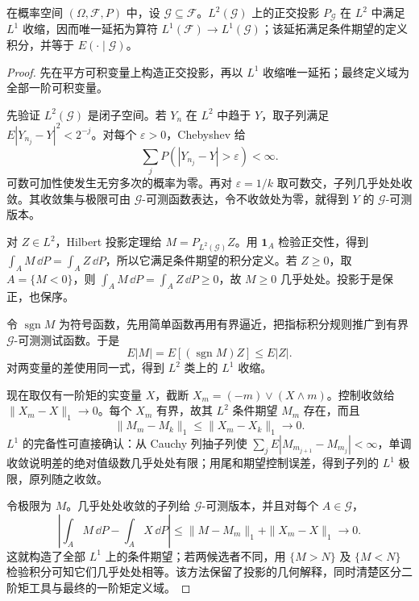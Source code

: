\begin{lemma}
在概率空间 $(\Omega,\mathcal F,P)$ 中，设 $\mathcal G\subseteq\mathcal F$。$L^2(\mathcal G)$ 上的正交投影 $P_{\mathcal G}$ 在 $L^2$ 中满足 $L^1$ 收缩，因而唯一延拓为算符 $L^1(\mathcal F)\to L^1(\mathcal G)$；该延拓满足条件期望的定义积分，并等于 $E(\cdot\mid\mathcal G)$。
\end{lemma}
\begin{proof}
先在平方可积变量上构造正交投影，再以 $L^1$ 收缩唯一延拓；最终定义域为全部一阶可积变量。

先验证 $L^2(\mathcal G)$ 是闭子空间。若 $Y_n$ 在 $L^2$ 中趋于 $Y$，取子列满足 $E|Y_{n_j}-Y|^2<2^{-j}$。对每个 $\varepsilon>0$，Chebyshev 给
\[
 \sum_jP(|Y_{n_j}-Y|>\varepsilon)<\infty.
\]
可数可加性使发生无穷多次的概率为零。再对 $\varepsilon=1/k$ 取可数交，子列几乎处处收敛。其收敛集与极限可由 $\mathcal G$-可测函数表达，令不收敛处为零，就得到 $Y$ 的 $\mathcal G$-可测版本。

对 $Z\in L^2$，Hilbert 投影定理给 $M=P_{L^2(\mathcal G)}Z$。用 $\mathbf1_A$ 检验正交性，得到 $\int_AM\,\dd P=\int_AZ\,\dd P$，所以它满足条件期望的积分定义。若 $Z\ge0$，取 $A=\{M<0\}$，则 $\int_AM\,\dd P=\int_AZ\,\dd P\ge0$，故 $M\ge0$ 几乎处处。投影于是保正，也保序。

令 $\operatorname{sgn}M$ 为符号函数，先用简单函数再用有界逼近，把指标积分规则推广到有界 $\mathcal G$-可测测试函数。于是
\[
 E|M|=E[(\operatorname{sgn}M)Z]\le E|Z|.
\]
对两变量的差使用同一式，得到 $L^2$ 类上的 $L^1$ 收缩。

现在取仅有一阶矩的实变量 $X$，截断 $X_m=(-m)\vee(X\wedge m)$。控制收敛给 $\|X_m-X\|_1\to0$。每个 $X_m$ 有界，故其 $L^2$ 条件期望 $M_m$ 存在，而且
\[
 \|M_m-M_k\|_1\le\|X_m-X_k\|_1\longrightarrow0.
\]
$L^1$ 的完备性可直接确认：从 Cauchy 列抽子列使 $\sum_jE|M_{m_{j+1}}-M_{m_j}|<\infty$，单调收敛说明差的绝对值级数几乎处处有限；用尾和期望控制误差，得到子列的 $L^1$ 极限，原列随之收敛。

令极限为 $M$。几乎处处收敛的子列给 $\mathcal G$-可测版本，并且对每个 $A\in\mathcal G$，
\[
 \left|\int_AM\,\dd P-\int_AX\,\dd P\right|
 \le\|M-M_m\|_1+\|X_m-X\|_1\longrightarrow0.
\]
这就构造了全部 $L^1$ 上的条件期望；若两候选者不同，用 $\{M>N\}$ 及 $\{M<N\}$ 检验积分可知它们几乎处处相等。该方法保留了投影的几何解释，同时清楚区分二阶矩工具与最终的一阶矩定义域。
\end{proof}


